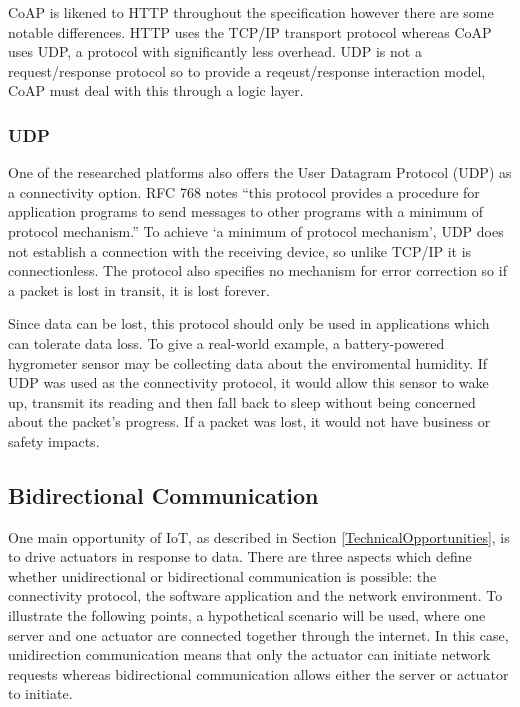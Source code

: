         CoAP is likened to HTTP throughout the specification however there are some notable differences. HTTP uses the TCP/IP transport protocol whereas CoAP uses UDP, a protocol with significantly less overhead. UDP is not a request/response protocol so to provide a reqeust/response interaction model, CoAP must deal with this through a logic layer.

      \subsubsection{UDP}
        One of the researched platforms also offers the User Datagram Protocol (UDP) as a connectivity option. RFC 768 \citep{rfc768} notes ``this protocol provides a procedure for application programs to send messages to other programs with a minimum of protocol mechanism.'' To achieve `a minimum of protocol mechanism', UDP does not establish a connection with the receiving device, so unlike TCP/IP it is connectionless. The protocol also specifies no mechanism for error correction so if a packet is lost in transit, it is lost forever.

        Since data can be lost, this protocol should only be used in applications which can tolerate data loss. To give a real-world example, a battery-powered hygrometer sensor may be collecting data about the enviromental humidity. If UDP was used as the connectivity protocol, it would allow this sensor to wake up, transmit its reading and then fall back to sleep without being concerned about the packet's progress. If a packet was lost, it would not have business or safety impacts.

    \subsection{Bidirectional Communication} \label{bidirectioncomms}
      One main opportunity of IoT, as described in Section \ref{TechnicalOpportunities}, is to drive actuators in response to data. There are three aspects which define whether unidirectional or bidirectional communication is possible: the connectivity protocol, the software application and the network environment. To illustrate the following points, a hypothetical scenario will be used, where one server and one actuator are connected together through the internet. In this case, unidirection communication means that only the actuator can initiate network requests whereas bidirectional communication allows either the server or actuator to initiate.

